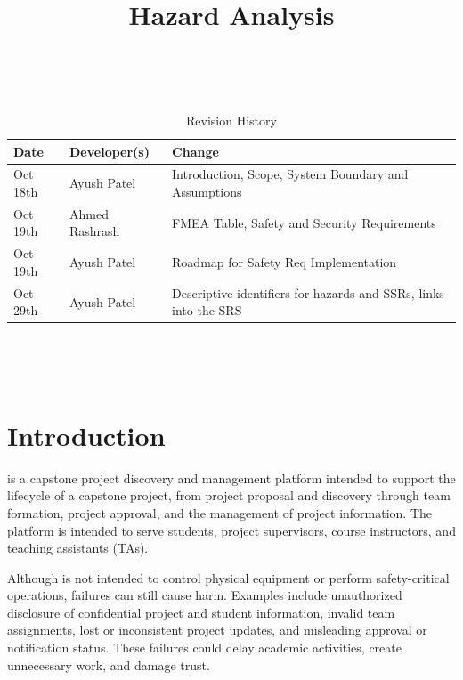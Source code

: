 \documentclass{article}
\title{Hazard Analysis\\\projname}
\author{\authname}
\date{}
\begin{document}
\maketitle
\thispagestyle{empty}

~\newpage


\begin{table}[hp]
\caption{Revision History} \label{TblRevisionHistory}
\begin{tabularx}{\textwidth}{llX}
\toprule
\textbf{Date} & \textbf{Developer(s)} & \textbf{Change}\\
\midrule
Oct 18th & Ayush Patel & Introduction, Scope, System Boundary and Assumptions\\
Oct 19th & Ahmed Rashrash & FMEA Table, Safety and Security Requirements\\
Oct 19th & Ayush Patel & Roadmap for Safety Req Implementation \\
Oct 29th & Ayush Patel & Descriptive identifiers for hazards and SSRs, links into the SRS \\
\bottomrule
\end{tabularx}
\end{table}

~\newpage

\tableofcontents

\listoffigures
\listoftables

~\newpage



\section{Introduction}


\projname{} is a capstone project discovery and management platform intended to support the lifecycle of a capstone
project, from project proposal and discovery through team formation, project approval, and the management of
project information. The platform is intended to serve students, project supervisors, course instructors, and
teaching assistants (TAs).

Although \projname{} is not intended to control physical equipment or perform safety-critical operations, failures can
still cause harm. Examples include unauthorized disclosure of confidential project and student information,
invalid team assignments, lost or inconsistent project updates, and misleading approval or notification status.
These failures could delay academic activities, create unnecessary work, and damage trust.
\end{document}
